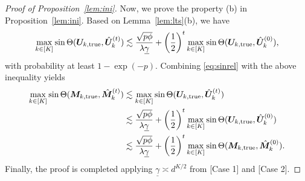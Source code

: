 \documentclass[12pt]{article}
\theoremstyle{definition}
\begin{document}
\begin{proof}[Proof of Proposition~\ref{lem:ini}]
Now, we prove the property (b) in Proposition~\ref{lem:ini}. Based on Lemma~\ref{lem:lts}(b), we have
 \begin{align}\label{eq:lt2}
      \max_{k\in[K]}\sin\Theta(\bm{U}_{k,\text{true}},\hat{\bm{U}}_k^{(t)})\lesssim \frac{\sqrt{p\phi}}{\lambda\underline\gamma}+ \left(1\over 2\right)^t\max_{k\in[K]}\sin\Theta(\bm{U}_{k,\text{true}},\hat{\bm{U}}_k^{(0)}),
 \end{align}
  with probability at least $1-\exp(-p)$.
  Combining \eqref{eq:sinrel} with the above inequality yields
 \begin{align}
     \max_{k\in[K]}\sin\Theta(\bm M_{k,\text{true}},\hat{\bm M}_k^{(t)}) 
    &\lesssim \max_{k\in[K]}\sin\Theta(\bm{U}_{k,\text{true}},\hat{\bm{U}}_k^{(t)})\\&\lesssim \frac{\sqrt{p\phi}}{\lambda\underline\gamma}+ \left(1\over 2\right)^t\max_{k\in[K]}\sin\Theta(\bm{U}_{k,\text{true}},\hat{\bm{U}}_k^{(0)})\\&\lesssim\frac{\sqrt{p\phi}}{\lambda\underline\gamma}+ \left(1\over2\right)^t\max_{k\in[K]}\sin\Theta(\bm M_{k,\text{true}},\hat{\bm M}_k^{(0)}).
 \end{align}
Finally, the proof is completed applying $\underline\gamma\asymp d^{K/2}$ from [Case 1] and [Case 2].
\end{proof}
\end{document}
